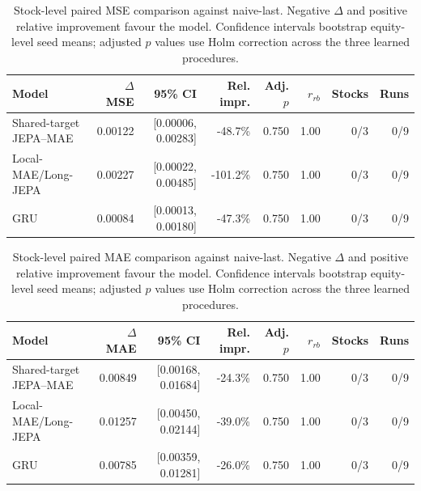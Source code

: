 \begin{table}[t]
\centering
\small
\caption{Stock-level paired MSE comparison against naive-last. Negative $\Delta$ and positive relative improvement favour the model. Confidence intervals bootstrap equity-level seed means; adjusted $p$ values use Holm correction across the three learned procedures.}
\label{tab:paired_mse_naive}
\begin{tabular}{lrrrrrrr}
\toprule
Model & $\Delta$MSE & 95\% CI & Rel. impr. & Adj. $p$ & $r_{rb}$ & Stocks & Runs \\
\midrule
Shared-target JEPA--MAE & 0.00122 & [0.00006, 0.00283] & -48.7\% & 0.750 & 1.00 & 0/3 & 0/9 \\
Local-MAE/Long-JEPA & 0.00227 & [0.00022, 0.00485] & -101.2\% & 0.750 & 1.00 & 0/3 & 0/9 \\
GRU & 0.00084 & [0.00013, 0.00180] & -47.3\% & 0.750 & 1.00 & 0/3 & 0/9 \\
\bottomrule
\end{tabular}
\end{table}

\begin{table}[t]
\centering
\small
\caption{Stock-level paired MAE comparison against naive-last. Negative $\Delta$ and positive relative improvement favour the model. Confidence intervals bootstrap equity-level seed means; adjusted $p$ values use Holm correction across the three learned procedures.}
\label{tab:paired_mae_naive}
\begin{tabular}{lrrrrrrr}
\toprule
Model & $\Delta$MAE & 95\% CI & Rel. impr. & Adj. $p$ & $r_{rb}$ & Stocks & Runs \\
\midrule
Shared-target JEPA--MAE & 0.00849 & [0.00168, 0.01684] & -24.3\% & 0.750 & 1.00 & 0/3 & 0/9 \\
Local-MAE/Long-JEPA & 0.01257 & [0.00450, 0.02144] & -39.0\% & 0.750 & 1.00 & 0/3 & 0/9 \\
GRU & 0.00785 & [0.00359, 0.01281] & -26.0\% & 0.750 & 1.00 & 0/3 & 0/9 \\
\bottomrule
\end{tabular}
\end{table}
